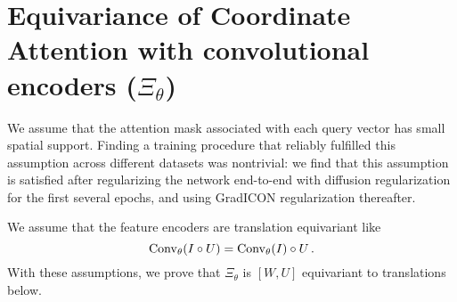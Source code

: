 \section{Equivariance of Coordinate Attention with convolutional encoders (\texorpdfstring{$\Xi_\theta$)}{XiTheta}}
\label{sec:wuproof}
We assume that the attention mask associated with each query vector has small spatial
support. Finding a training procedure that reliably fulfilled this assumption across different datasets was nontrivial: we find that this assumption is satisfied after regularizing the  network end-to-end with diffusion
regularization for the first several epochs, and using GradICON regularization thereafter. %

We assume that the feature encoders are translation equivariant like
\begin{equation}
	\operatorname{Conv}_\theta(I \circ U) = \operatorname{Conv}_\theta(I) \circ U
	\label{convdef}\,.
\end{equation}
With these assumptions, we prove that $\Xi_\theta$ is $[W, U]$ equivariant to translations below.

